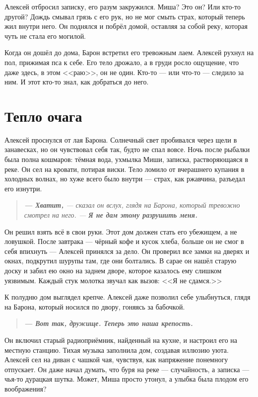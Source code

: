 \documentclass[12pt,a4paper]{book}
\newenvironment{dialogue}{\begin{quote}\itshape}{\end{quote}} %
\begin{document}
Алексей отбросил записку, его разум закружился. Миша? Это он? Или кто-то другой? Дождь смывал грязь с его рук, но не мог смыть страх, который теперь жил внутри него. Он поднялся и побрёл домой, оставляя за собой реку, которая чуть не стала его могилой.

Когда он дошёл до дома, Барон встретил его тревожным лаем. Алексей рухнул на пол, прижимая пса к себе. Его тело дрожало, а в груди росло ощущение, что даже здесь, в этом <<раю>>, он не один. Кто-то --- или что-то --- следило за ним. И этот кто-то знал, как добраться до него.

\chapter{Тепло очага}

Алексей проснулся от лая Барона. Солнечный свет пробивался через щели в занавесках, но он чувствовал себя так, будто не спал вовсе. Ночь после рыбалки была полна кошмаров: тёмная вода, ухмылка Миши, записка, растворяющаяся в реке. Он сел на кровати, потирая виски. Тело ломило от вчерашнего купания в холодных волнах, но хуже всего было внутри --- страх, как ржавчина, разъедал его изнутри.

\begin{dialogue}
\textbf{--- Хватит,} --- сказал он вслух, глядя на Барона, который тревожно смотрел на него. --- \textbf{Я не дам этому разрушить меня.}
\end{dialogue}

Он решил взять всё в свои руки. Этот дом должен стать его убежищем, а не ловушкой. После завтрака --- чёрный кофе и кусок хлеба, больше он не смог в себя впихнуть --- Алексей принялся за дело. Он проверил все замки на дверях и окнах, подкрутил шурупы там, где они болтались. В сарае он нашёл старую доску и забил ею окно на заднем дворе, которое казалось ему слишком уязвимым. Каждый стук молотка звучал как вызов: <<Я не сдамся.>>

К полудню дом выглядел крепче. Алексей даже позволил себе улыбнуться, глядя на Барона, который носился по двору, гоняясь за бабочкой.

\begin{dialogue}
\textbf{--- Вот так, дружище. Теперь это наша крепость.}
\end{dialogue}

Он включил старый радиоприёмник, найденный на кухне, и настроил его на местную станцию. Тихая музыка заполнила дом, создавая иллюзию уюта. Алексей сел на диван с чашкой чая, чувствуя, как напряжение понемногу отпускает. Он даже начал думать, что буря на реке --- случайность, а записка --- чья-то дурацкая шутка. Может, Миша просто утонул, а улыбка была плодом его воображения?
\end{document}
